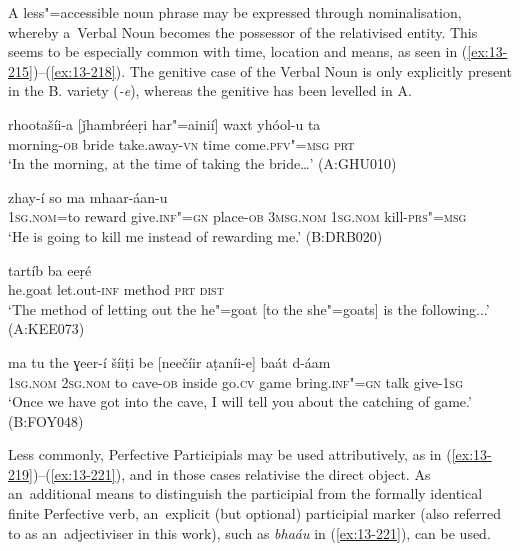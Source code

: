 A less"=accessible noun phrase may be expressed through nominalisation, whereby a~Verbal Noun becomes the possessor of the relativised entity. This seems to be especially common with time, location and means, as seen in (\ref{ex:13-215})--(\ref{ex:13-218}). The genitive case of the Verbal Noun is only explicitly present in the B. variety (\textit{-e}), whereas the genitive has been levelled in A.

\begin{exe}
\ex
\label{ex:13-215}
\gll rhootašíi-a [ǰhambréeṛi har"=ainií] waxt  yhóol-u ta \\
morning-\textsc{ob} bride take.away-\textsc{vn} time come.\textsc{pfv"=msg} \textsc{prt} \\
\glt `In the morning, at the time of taking the bride{\ldots}' (A:GHU010)

\ex
\label{ex:13-216}
\gll [máa=the bašéš deníi-e] zhay-í so  ma mhaar-áan-u \\
\textsc{1sg.nom}=to reward give.\textsc{inf"=gn} place-\textsc{ob} \textsc{3msg.nom} \textsc{1sg.nom} kill-\textsc{prs"=msg} \\
\glt `He is going to kill me instead of rewarding me.' (B:DRB020)

\ex
\label{ex:13-217}
 tartíb ba eeṛé  \\
he.goat let.out-\textsc{inf} method \textsc{prt} \textsc{dist} \\
\glt `The method of letting out the he"=goat [to the she"=goats] is the following...' (A:KEE073)

\ex
\label{ex:13-218}
\gll ma tu the ɣeer-í šíiṭi be [neečíir  aṭaníi-e] baát d-áam \\
\textsc{1sg.nom} \textsc{2sg.nom} to cave-\textsc{ob} inside go.\textsc{cv} game  bring.\textsc{inf"=gn} talk give-\textsc{1sg} \\
\glt `Once we have got into the cave, I will tell you about the catching of game.' (B:FOY048) 
\end{exe}

Less commonly, Perfective Participials may be used attributively, as in (\ref{ex:13-219})--(\ref{ex:13-221}), and in those cases relativise the direct object. As an~additional means to distinguish the participial from the formally identical finite Perfective verb, an~explicit (but optional) participial marker (also referred to as an~adjectiviser in this work), such as \textit{bhaáu} in (\ref{ex:13-221}), can be used.

